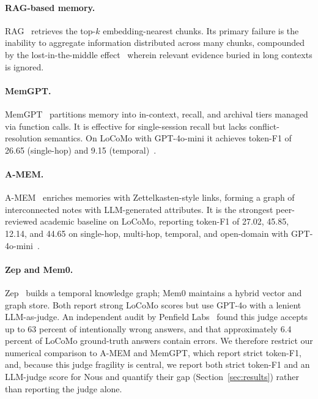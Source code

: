\documentclass[11pt,a4paper,twocolumn]{article}
\begin{document}
\paragraph{RAG-based memory.}
RAG~\citep{lewis2020rag} retrieves the top-$k$ embedding-nearest chunks. Its
primary failure is the inability to aggregate information distributed across
many chunks, compounded by the lost-in-the-middle effect~\citep{liu2023lost}
wherein relevant evidence buried in long contexts is ignored.

\paragraph{MemGPT.}
MemGPT~\citep{packer2023memgpt} partitions memory into in-context, recall,
and archival tiers managed via function calls. It is effective for
single-session recall but lacks conflict-resolution semantics. On LoCoMo with
GPT-4o-mini it achieves token-F1 of 26.65 (single-hop) and 9.15
(temporal)~\citep{xu2025amem}.

\paragraph{A-MEM.}
A-MEM~\citep{xu2025amem} enriches memories with Zettelkasten-style links,
forming a graph of interconnected notes with LLM-generated attributes. It is
the strongest peer-reviewed academic baseline on LoCoMo, reporting token-F1 of
27.02, 45.85, 12.14, and 44.65 on single-hop, multi-hop, temporal, and
open-domain with GPT-4o-mini~\citep{xu2025amem}.

\paragraph{Zep and Mem0.}
Zep~\citep{zep2024graphiti} builds a temporal knowledge graph; Mem0
\citep{chhikara2025mem0} maintains a hybrid vector and graph store. Both
report strong LoCoMo scores but use GPT-4o with a lenient LLM-as-judge.
An independent audit by Penfield Labs~\citep{locomo2025audit} found this judge
accepts up to 63 percent of intentionally wrong answers, and that approximately
6.4 percent of LoCoMo ground-truth answers contain errors.
We therefore restrict our numerical comparison to A-MEM and MemGPT, which report
strict token-F1, and, because this judge fragility is central, we report both
strict token-F1 and an LLM-judge score for Nous and quantify their gap
(Section~\ref{sec:results}) rather than reporting the judge alone.
\end{document}
